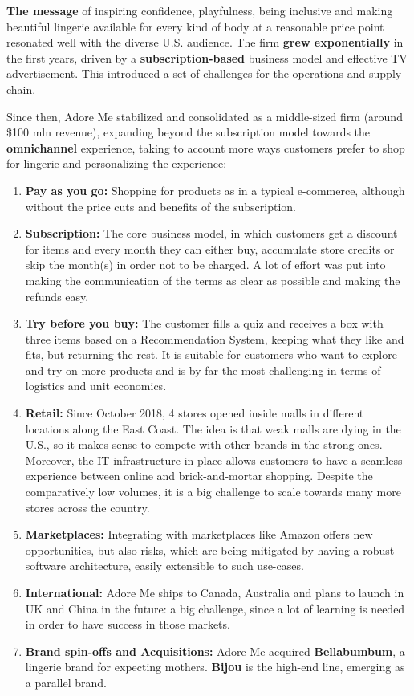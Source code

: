 \documentclass[12pt]{article}
\begin{document}
\textbf{The message} of inspiring confidence, playfulness, being inclusive and making beautiful lingerie available for every kind of body at a reasonable price point resonated well with the diverse U.S. audience. The firm \textbf{grew exponentially} in the first years, driven by a \textbf{subscription-based} business model and effective TV advertisement. This introduced a set of challenges for the operations and supply chain.

Since then, Adore Me stabilized and consolidated as a middle-sized firm (around \$100 mln revenue), expanding beyond the subscription model towards the \textbf{omnichannel} experience, taking to account more ways customers prefer to shop for lingerie and personalizing the experience:

\begin{enumerate}
	\item \textbf{Pay as you go:} Shopping for products as in a typical e-commerce, although without the price cuts and benefits of the subscription.
	\item \textbf{Subscription:} The core business model, in which customers get a discount for items and every month they can either buy, accumulate store credits or skip the month(s) in order not to be charged. A lot of effort was put into making the communication of the terms as clear as possible and making the refunds easy.
	\item \textbf{Try before you buy:} The customer fills a quiz and receives a box with three items based on a Recommendation System, keeping what they like and fits, but returning the rest. It is suitable for customers who want to explore and try on more products and is by far the most challenging in terms of logistics and unit economics.
	\item \textbf{Retail:} Since October 2018, 4 stores opened inside malls in different locations along the East Coast. The idea is that weak malls are dying in the U.S., so it makes sense to compete with other brands in the strong ones. Moreover, the IT infrastructure in place allows customers to have a seamless experience between online and brick-and-mortar shopping. Despite the comparatively low volumes, it is a big challenge to scale towards many more stores across the country.
	\item \textbf{Marketplaces:} Integrating with marketplaces like Amazon offers new opportunities, but also risks, which are being mitigated by having a robust software architecture, easily extensible to such use-cases.
	\item \textbf{International:} Adore Me ships to Canada, Australia and plans to launch in UK and China in the future: a big challenge, since a lot of learning is needed in order to have success in those markets.
	\item \textbf{Brand spin-offs and Acquisitions:} Adore Me acquired \textbf{Bellabumbum}, a lingerie brand for expecting mothers. \textbf{Bijou} is the high-end line, emerging as a parallel brand.
\end{enumerate}
\end{document}
